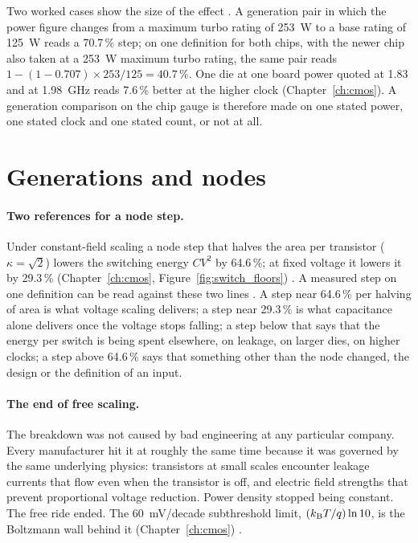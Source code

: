 Two worked cases show the size of the effect \calc. A generation pair in which the power figure changes from a maximum turbo rating of 253~W
to a base rating of 125~W reads a 70.7\,\% step; on one definition for both chips, with the newer chip also taken at a 253~W maximum turbo rating, the same pair reads $1-(1-0.707)\times253/125=40.7$\,\%.
One die at one board power quoted at 1.83 and at 1.98~GHz reads 7.6\,\% better at the higher clock (Chapter~\ref{ch:cmos}). A generation
comparison on the chip gauge is therefore made on one stated power, one stated clock and one stated count, or not at all.

\section{Generations and nodes}\label{sec:cg_nodes}
\paragraph{Two references for a node step.} Under constant-field scaling a node step that halves the area per transistor ($\kappa=\sqrt2$)
lowers the switching energy $CV^2$ by 64.6\,\%; at fixed voltage it lowers it by 29.3\,\% (Chapter~\ref{ch:cmos}, Figure~\ref{fig:switch_floors})
\derived. A measured step on one definition can be read against these two lines \interp. A step near 64.6\,\% per halving of area is what
voltage scaling delivers; a step near 29.3\,\% is what capacitance alone delivers once the voltage stops falling; a step below that says that
the energy per switch is being spent elsewhere, on leakage, on larger dies, on higher clocks; a step above 64.6\,\% says that something other
than the node changed, the design or the definition of an input.

\paragraph{The end of free scaling.} The breakdown was not caused by bad engineering at any particular company. Every manufacturer hit it at
roughly the same time because it was governed by the same underlying physics: transistors at small scales encounter leakage currents that
flow even when the transistor is off, and electric field strengths that prevent proportional voltage reduction. Power density stopped being
constant. The free ride ended. The 60~mV/decade subthreshold limit, $(k_{\mathrm B} T/q)\ln10$, is the Boltzmann wall behind it (Chapter~\ref{ch:cmos})
\derived.

